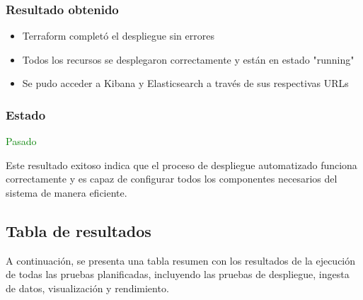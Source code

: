\subsubsection{Resultado obtenido}
\begin{itemize}
    \item Terraform completó el despliegue sin errores
    \item Todos los recursos se desplegaron correctamente y están en estado
    "running"
    \item Se pudo acceder a Kibana y Elasticsearch a través de sus respectivas
    URLs
\end{itemize}

\subsubsection{Estado} \textcolor{green}{Pasado}

Este resultado exitoso indica que el proceso de despliegue automatizado
funciona correctamente y es capaz de configurar todos los componentes
necesarios del sistema de manera eficiente.


\newpage{}
\subsection{Tabla de resultados}
A continuación, se presenta una tabla resumen con los resultados de la
ejecución de todas las pruebas planificadas, incluyendo las pruebas de
despliegue, ingesta de datos, visualización y rendimiento.

